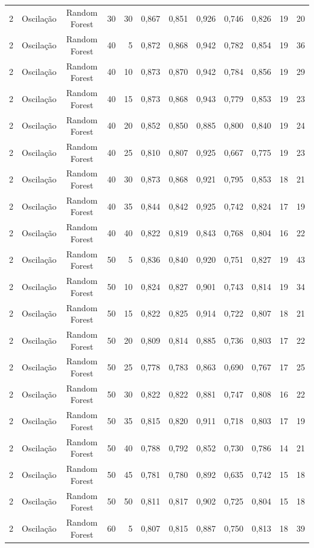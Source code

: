 \begin{longtable}{ccclrrrrrrrr}
2 & Oscilação & Random Forest & 30 & 30 & 0,867 & 0,851 & 0,926 & 0,746 & 0,826 & 19 & 20 \\
2 & Oscilação & Random Forest & 40 & 5 & 0,872 & 0,868 & 0,942 & 0,782 & 0,854 & 19 & 36 \\
2 & Oscilação & Random Forest & 40 & 10 & 0,873 & 0,870 & 0,942 & 0,784 & 0,856 & 19 & 29 \\
2 & Oscilação & Random Forest & 40 & 15 & 0,873 & 0,868 & 0,943 & 0,779 & 0,853 & 19 & 23 \\
2 & Oscilação & Random Forest & 40 & 20 & 0,852 & 0,850 & 0,885 & 0,800 & 0,840 & 19 & 24 \\
2 & Oscilação & Random Forest & 40 & 25 & 0,810 & 0,807 & 0,925 & 0,667 & 0,775 & 19 & 23 \\
2 & Oscilação & Random Forest & 40 & 30 & 0,873 & 0,868 & 0,921 & 0,795 & 0,853 & 18 & 21 \\
2 & Oscilação & Random Forest & 40 & 35 & 0,844 & 0,842 & 0,925 & 0,742 & 0,824 & 17 & 19 \\
2 & Oscilação & Random Forest & 40 & 40 & 0,822 & 0,819 & 0,843 & 0,768 & 0,804 & 16 & 22 \\
2 & Oscilação & Random Forest & 50 & 5 & 0,836 & 0,840 & 0,920 & 0,751 & 0,827 & 19 & 43 \\
2 & Oscilação & Random Forest & 50 & 10 & 0,824 & 0,827 & 0,901 & 0,743 & 0,814 & 19 & 34 \\
2 & Oscilação & Random Forest & 50 & 15 & 0,822 & 0,825 & 0,914 & 0,722 & 0,807 & 18 & 21 \\
2 & Oscilação & Random Forest & 50 & 20 & 0,809 & 0,814 & 0,885 & 0,736 & 0,803 & 17 & 22 \\
2 & Oscilação & Random Forest & 50 & 25 & 0,778 & 0,783 & 0,863 & 0,690 & 0,767 & 17 & 25 \\
2 & Oscilação & Random Forest & 50 & 30 & 0,822 & 0,822 & 0,881 & 0,747 & 0,808 & 16 & 22 \\
2 & Oscilação & Random Forest & 50 & 35 & 0,815 & 0,820 & 0,911 & 0,718 & 0,803 & 17 & 19 \\
2 & Oscilação & Random Forest & 50 & 40 & 0,788 & 0,792 & 0,852 & 0,730 & 0,786 & 14 & 21 \\
2 & Oscilação & Random Forest & 50 & 45 & 0,781 & 0,780 & 0,892 & 0,635 & 0,742 & 15 & 18 \\
2 & Oscilação & Random Forest & 50 & 50 & 0,811 & 0,817 & 0,902 & 0,725 & 0,804 & 15 & 18 \\
2 & Oscilação & Random Forest & 60 & 5 & 0,807 & 0,815 & 0,887 & 0,750 & 0,813 & 18 & 39 \\

\end{longtable}
